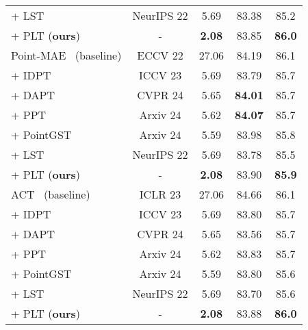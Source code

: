\begin{table}
\begin{tabular}{lcccc}
    + LST~\cite{sung2022lst} & NeurIPS 22 & 5.69 & 83.38 & 85.2 \\
    \rowcolor{linecolor!40}+ PLT (\textbf{ours})& - & \textbf{2.08}  & 83.85 & \textbf{86.0} \\
    \midrule
    Point-MAE~\cite{pang2022masked} (baseline) &  ECCV 22 & 27.06 & 84.19 & 86.1 \\ 
    + IDPT~\cite{zha2023instance} & ICCV 23 & 5.69  & 83.79  & 85.7  \\
    + DAPT~\cite{zhou2024dynamic} & CVPR 24 & 5.65  & \textbf{84.01} & 85.7 \\
    + PPT~\cite{zhang2024positional} & Arxiv 24 & 5.62  & \textbf{84.07} & 85.7 \\
    + PointGST~\cite{liang2024parameter} & Arxiv 24 & 5.59  & 83.98 & 85.8 \\
    + LST~\cite{sung2022lst} & NeurIPS 22 & 5.69 & 83.78 & 85.5\\
    \rowcolor{linecolor!40}+ PLT (\textbf{ours})& - & \textbf{2.08}  & 83.90 & \textbf{85.9} \\
    \midrule
    ACT~\cite{dong2022autoencoders} (baseline)  & ICLR 23 &  27.06 & 84.66 & 86.1 \\
    + IDPT~\cite{zha2023instance} & ICCV 23 & 5.69  & 83.80  & 85.7  \\
    + DAPT~\cite{zhou2024dynamic} & CVPR 24 & 5.65  & 83.56 & 85.7 \\
    + PPT~\cite{zhang2024positional} & Arxiv 24 & 5.62  & 83.83 & 85.7 \\
    + PointGST~\cite{liang2024parameter} & Arxiv 24 & 5.59  & 83.80 & 85.6 \\
    + LST~\cite{sung2022lst} & NeurIPS 22 & 5.69 & 83.70 & 85.6\\
    \rowcolor{linecolor!40}+ PLT (\textbf{ours})& - & \textbf{2.08}  & 83.88 & \textbf{86.0} \\
    \bottomrule
    \end{tabular}
  \label{tab:segmentation}
\end{table}